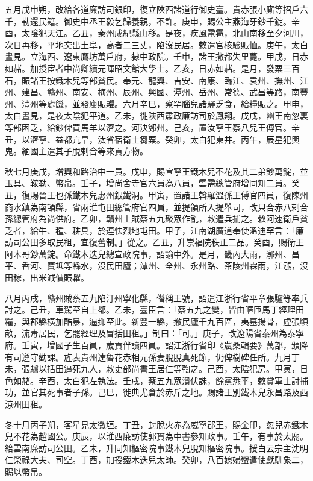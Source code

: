 \begin{pinyinscope}
 五月戊申朔，改給各道廉訪司銀印，復立陜西諸道行御史臺。貴赤張小廝等招戶六千，勒還民籍。御史中丞王毅乞歸養親，不許。庚申，賜公主燕海牙鈔千錠。辛酉，太陰犯天江。乙丑，秦州成紀縣山移。是夜，疾風電雹，北山南移至夕河川，次日再移，平地突出土阜，高者二三丈，陷沒民居。敕遣官核驗賑恤。庚午，太白晝見。立海西、遼東鷹坊萬戶府，隸中政院。壬申，諸王撒都失里薨。甲戌，日赤如赭。加授宦者中尚卿續元暉昭文館大學士。乙亥，日赤如赭。是月，發粟三百石，賑諸王按鐵木兒等部貧民。奉元、龍興、吉安、南康、臨江、袁州、撫州、江州、建昌、贛州、南安、梅州、辰州、興國、潭州、岳州、常德、武昌等路，南豐州、澧州等處饑，並發廩賑糶。六月辛巳，察罕腦兒諸驛乏食，給糧賑之。甲申，太白晝見，是夜太陰犯平道。乙未，徙陜西肅政廉訪司於鳳翔。戊戌，豳王南忽裏等部困乏，給鈔俾買馬羊以濟之。河決鄭州。己亥，置汝寧王察八兒王傅官。辛丑，以濟寧、益都亢旱，汰省宿衛士芻粟。癸卯，太白犯東井。丙午，辰星犯輿鬼。緬國主遣其子脫剌合等來貢方物。



 秋七月庚戌，增興和路治中一員。戊申，賜宣寧王鐵木兒不花及其二弟鈔萬錠，並玉具、鞍勒、幣帛。壬子，增尚舍寺官六員為八員，雲需總管府增同知二員。癸丑，復賜晉王也孫鐵木兒惠州銀鐵洞。甲寅，置諸王斡羅溫孫王傅官四員，復陳州商水鎮為南頓縣，省兩淮屯田總管府官四員，並提領所入提舉司，改只合赤八剌合孫總管府為尚供府。乙卯，贛州土賊蔡五九聚眾作亂，敕遣兵捕之。敕阿速衛戶貧乏者，給牛、種、耕具，於連怯烈地屯田。甲子，江南湖廣道奉使溫迪罕言：「廉訪司公田多取民租，宜復舊制。」從之。乙丑，升崇福院秩正二品。癸酉，賜衛王阿木哥鈔萬錠。命鐵木迭兒總宣政院事，詔諭中外。是月，畿內大雨，漷州、昌平、香河、寶坻等縣水，沒民田廬；潭州、全州、永州路、茶陵州霖雨，江漲，沒田稼，出米減價賑糶。



 八月丙戌，贛州賊蔡五九陷汀州寧化縣，僭稱王號，詔遣江浙行省平章張驢等率兵討之。己丑，車駕至自上都。乙未，臺臣言：「蔡五九之變，皆由暱匝馬丁經理田糧，與郡縣橫加酷暴，逼抑至此。新豐一縣，撤民廬千九百區，夷墓揚骨，虛張頃畝，流毒居民，乞罷經理及冒括田租。」制曰：「可。」庚子，改遼陽省泰州為泰寧府。壬寅，增國子生百員，歲貢伴讀四員。詔江浙行省印《農桑輯要》萬部，頒降有司遵守勸課。旌表貴州達魯花赤相元孫妻脫脫真死節，仍俾樹碑任所。九月丁未，張驢以括田逼死九人，敕吏部尚書王居仁等鞫之。己酉，太陰犯房。甲寅，日色如赭。辛酉，太白犯左執法。壬戌，蔡五九眾潰伏誅，餘黨悉平，敕賞軍士討捕功，並官其死事者子孫。己巳，徙典尤倉於赤斤之地。賜諸王別鐵木兒永昌路及西涼州田租。



 冬十月丙子朔，客星見太微垣。丁丑，封脫火赤為威寧郡王，賜金印，忽兒赤鐵木兒不花為趙國公。庚辰，以淮西廉訪使郭貫為中書參知政事。壬午，有事於太廟。給雲南廉訪司公田。乙未，升同知樞密院事鐵木兒脫知樞密院事。授白云宗主沈明仁榮祿大夫、司空。丁酉，加授鐵木迭兒太師。癸卯，八百媳婦蠻遣使獻馴象二，賜以幣帛。




\end{pinyinscope}
